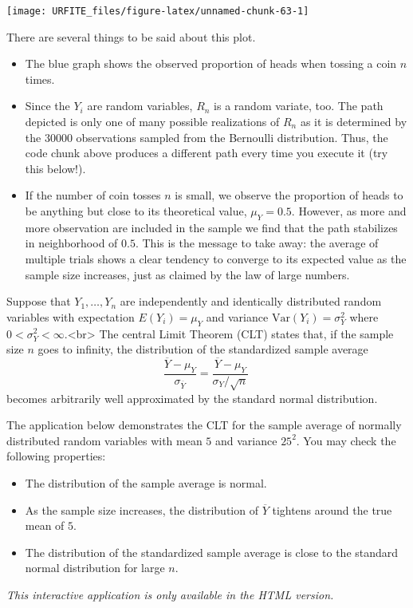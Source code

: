 \documentclass[]{book}
\theoremstyle{definition}
\theoremstyle{definition}
\theoremstyle{definition}
\theoremstyle{remark}
\begin{document}
\begin{center}\texttt{[image: URFITE\_files/figure-latex/unnamed-chunk-63-1]} \end{center}

There are several things to be said about this plot.

\begin{itemize}
\item
  The blue graph shows the observed proportion of heads when tossing a
  coin \(n\) times.
\item
  Since the \(Y_i\) are random variables, \(R_n\) is a random variate,
  too. The path depicted is only one of many possible realizations of
  \(R_n\) as it is determined by the \(30000\) observations sampled from
  the Bernoulli distribution. Thus, the code chunk above produces a
  different path every time you execute it (try this below!).
\item
  If the number of coin tosses \(n\) is small, we observe the proportion
  of heads to be anything but close to its theoretical value,
  \(\mu_Y = 0.5\). However, as more and more observation are included in
  the sample we find that the path stabilizes in neighborhood of
  \(0.5\). This is the message to take away: the average of multiple
  trials shows a clear tendency to converge to its expected value as the
  sample size increases, just as claimed by the law of large numbers.
\end{itemize}

\begin{keyconcepts}{2.7}
Suppose that $Y_1,\dots,Y_n$ are independently and identically distributed random variables with expectation $E(Y_i)=\mu_Y$ and variance $\text{Var}(Y_i)=\sigma^2_Y$ where $0<\sigma^2_Y<\infty$.<br>
The central Limit Theorem (CLT) states that, if the sample size $n$ goes to infinity, the distribution of the standardized sample average 
$$ \frac{\overline{Y} - \mu_Y}{\sigma_{\overline{Y}}} = \frac{\overline{Y} - \mu_Y}{\sigma_Y/\sqrt{n}} \ $$
becomes arbitrarily well approximated by the standard normal distribution.

The application below demonstrates the CLT for the sample average of normally distributed random variables with mean $5$ and variance $25^2$. You may check the following properties:\newline

\begin{itemize}
\item The distribution of the sample average is normal.
\item As the sample size increases, the distribution of $\overline{Y}$ tightens around the true mean of $5$.
\item The distribution of the standardized sample average is close to the standard normal distribution for large $n$.
\end{itemize}
\vspace{0.5cm}
\begin{center}
\textit{This interactive application is only available in the HTML version.}
\end{center}

\end{keyconcepts}
\end{document}
